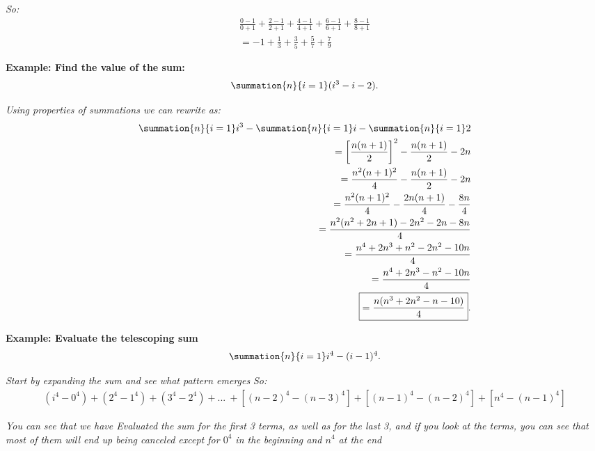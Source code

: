 \documentclass{report}
\begin{document}
\bigbreak \noindent
\textit{So:}
\begin{align*}
  \frac{0-1}{0+1} +\frac{2-1}{2+1} +\frac{4-1}{4+1} +\frac{6-1}{6+1} +\frac{8-1}{8+1}  \\
  = -1 + \frac{1}{3} + \frac{3}{5} + \frac{5}{7} + \frac{7}{9} 
\end{align*}

\bigbreak \noindent 
\begin{mdframed}
  \textbf{Example: Find the value of the sum:}
  \begin{align*}
    \summation{n}{i=1}(i^{3}-i-2)   
  .\end{align*}
\end{mdframed}

\bigbreak \noindent 
\textit{Using properties of summations we can rewrite as:}
\begin{align*}
  \summation{n}{i=1}i^{3} - \summation{n}{i=1}i - \summation{n}{i=1}2 \\
  = \bigg[\frac{n(n+1)}{2}\bigg]^{2} - \frac{n(n+1)}{2} - 2n \\
  = \frac{n^{2}(n+1)^{2}}{4}- \frac{n(n+1)}{2} - 2n \\
  =\frac{n^{2}(n+1)^{2}}{4} - \frac{2n(n+1)}{4} -\frac{8n}{4} \\
  =\frac{n^{2}(n^{2}+2n+1)-2n^{2}-2n-8n}{4} \\
  = \frac{n^{4}+2n^{3}+n^{2}-2n^{2}-10n}{4} \\
  = \frac{n^{4}+2n^{3}-n^{2}-10n}{4} \\
  \boxed{= \frac{n(n^{3}+2n^{2}-n-10)}{4}}
.\end{align*}

\bigbreak \noindent 
\begin{mdframed}
  \textbf{Example: Evaluate the telescoping sum}
  \begin{align*}
    \summation{n}{i=1}i^{4}-(i-1)^{4}
  .\end{align*}
\end{mdframed}

\bigbreak \noindent 
\textit{Start by expanding the sum and see what pattern emerges}
\bigbreak \noindent
\textit{So:}
\begin{align*}
  (i^{4}-0^{4}) + (2^{4}-1^{4}) +(3^{4}-2^{4}) + ...\ + [(n-2)^{4}-(n-3)^{4}] + [(n-1)^{4}-(n-2)^{4}] + [n^{4}-(n-1)^{4}]
\end{align*}

\bigbreak \noindent \bigbreak \noindent 
\textit{You can see that we have Evaluated the sum for the first 3 terms, as well as for the last 3, and if you look at the terms, you can see that most of them will end up being canceled except for $0^{4}$ in the beginning and
  $n^{4}$ at the end
}
\end{document}
